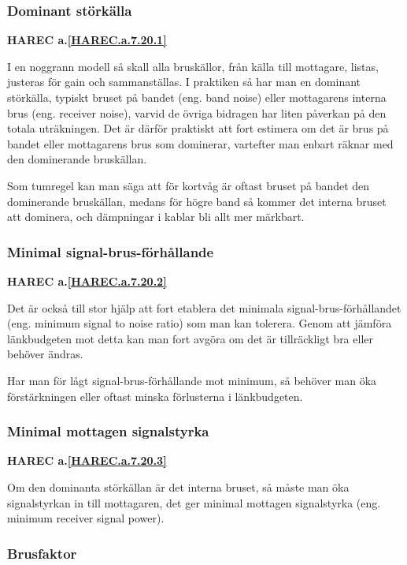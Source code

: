\subsubsection{Dominant störkälla}
\textbf{HAREC a.\ref{HAREC.a.7.20.1}\label{myHAREC.a.7.20.1}}

I en noggrann modell så skall alla bruskällor, från källa till mottagare,
listas, justeras för gain och sammanställas.
I praktiken så har man en dominant störkälla, typiskt bruset på bandet
(eng. band noise) eller mottagarens interna brus (eng. receiver noise),
varvid de övriga bidragen har liten påverkan på den totala uträkningen.
Det är därför praktiskt att fort estimera om det är brus på bandet eller
mottagarens brus som dominerar, vartefter man enbart räknar med den
dominerande bruskällan.

Som tumregel kan man säga att för kortvåg är oftast bruset på bandet
den dominerande bruskällan, medans för högre band så kommer det interna
bruset att dominera, och dämpningar i kablar bli allt mer märkbart.

\subsubsection{Minimal signal-brus-förhållande}
\textbf{HAREC a.\ref{HAREC.a.7.20.2}\label{myHAREC.a.7.20.2}}

Det är också till stor hjälp att fort etablera det minimala
signal-brus-förhållandet (eng. minimum signal to noise ratio)
som man kan tolerera.
Genom att jämföra länkbudgeten mot detta kan man fort avgöra om det är
tillräckligt bra eller behöver ändras.

Har man för lågt signal-brus-förhållande mot minimum, så behöver man öka
förstärkningen eller oftast minska förlusterna i länkbudgeten.

\subsubsection{Minimal mottagen signalstyrka}
\textbf{HAREC a.\ref{HAREC.a.7.20.3}\label{myHAREC.a.7.20.3}}

Om den dominanta störkällan är det interna bruset, så måste man öka
signalstyrkan in till mottagaren, det ger minimal mottagen signalstyrka
(eng. minimum receiver signal power).

\subsubsection{Brusfaktor}

